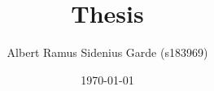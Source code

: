 \documentclass[10pt,a4paper]{report}
\title{Thesis}
\author{Albert Ramus Sidenius Garde (s183969)}
\date{\today}
\begin{document}
\maketitle
\tableofcontents

\def\isMain{true}





\end{document}
